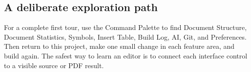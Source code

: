\subsection{A deliberate exploration path}
\label{sec:feature-map:explore}

For a complete first tour, use the Command Palette to find Document Structure,
Document Statistics, Symbols, Insert Table, Build Log, AI, Git, and
Preferences. Then return to this project, make one small change in each feature
area, and build again. The safest way to learn an editor is to connect each
interface control to a visible source or PDF result.
